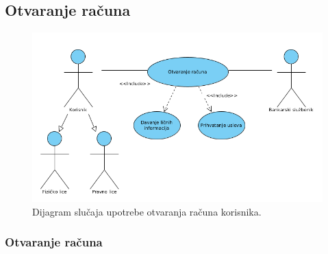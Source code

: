\documentclass{article}
\begin{document}
\subsection{\bfseries Otvaranje računa}
\begin{figure}
\begin{center}
\includegraphics[scale=0.5]{./UseCases/Pictures/otvaranjeRacuna.png}
\end{center}
    \caption{Dijagram slučaja upotrebe otvaranja računa korisnika.}
\label{fig:Otvaranje računa}
\end{figure}


\subsubsection{ Otvaranje računa}
\end{document}
